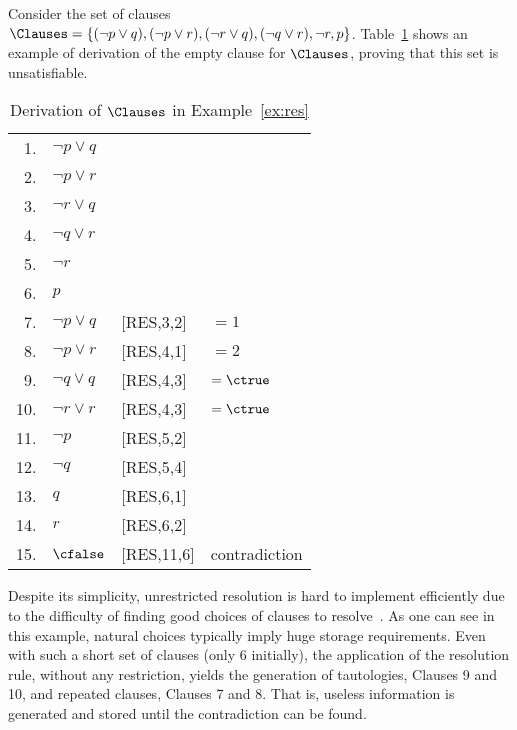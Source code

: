 \begin{example}%
\label{ex:res}
    Consider the set of clauses $\Clauses = \{(\neg p \lor q), (\neg p \lor r),
    (\neg r \lor q), (\neg q \lor r), \neg r, p\}$. Table~\ref{tab:res} shows an
    example of derivation of the empty clause for $\Clauses$, proving that this
    set is unsatisfiable. 

    \begin{table}%
    \caption{Derivation of $\Clauses$ in Example~\ref{ex:res}}
        \centering
        \begin{tabular}{rlll}
            1. & $\neg p \lor q$ & & \\
            2. & $\neg p \lor r$ & & \\
            3. & $\neg r \lor q$ & & \\
            4. & $\neg q \lor r$ & & \\
            5. & $\neg r$ & & \\
            6. & $p$ & & \\
            7. & $\neg p \lor q$ & [RES,3,2] & $= 1$\\
            8. & $\neg p \lor r$ & [RES,4,1] & $= 2$\\
            9. & $\neg q \lor q$ & [RES,4,3] & $= \ctrue$\\
            10.&  $\neg r \lor r$ & [RES,4,3] & $= \ctrue$\\
            11.&  $\neg p$ & [RES,5,2] & \\
            12.&  $\neg q$ & [RES,5,4] & \\
            13.&  $q$ & [RES,6,1] & \\
            14.&  $r$ & [RES,6,2] & \\
            15.&  $\cfalse$ & [RES,11,6] & contradiction\\
        \end{tabular}%
    \label{tab:res}
    \end{table}

    Despite its simplicity, unrestricted resolution is hard to implement
    efficiently due to the difficulty of finding good choices of clauses to
    resolve~\cite{satchapter}. As one can see in this example, natural choices
    typically imply huge storage requirements. Even with such a short set of
    clauses (only 6 initially), the application of the resolution rule, without
    any restriction, yields the generation of tautologies, Clauses 9 and 10, and
    repeated clauses, Clauses 7 and 8. That is, useless information is generated
    and stored until the contradiction can be found. 
\end{example}

